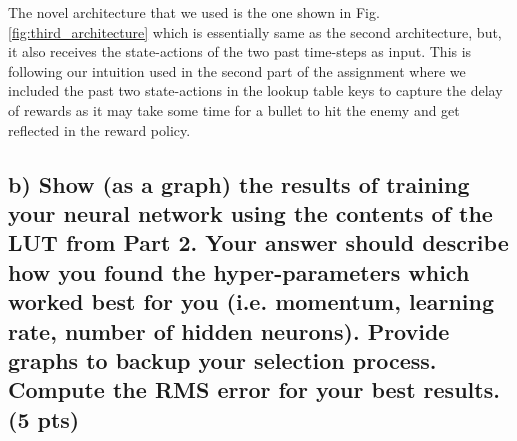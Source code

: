 \documentclass[a4paper,12pt]{article}
\begin{document}
The novel architecture that we used is the one shown in Fig. \ref{fig:third_architecture} which is essentially same as the second architecture, but, it also receives the state-actions of the two past time-steps as input. This is following our intuition used in the second part of the assignment where we included the past two state-actions in the lookup table keys to capture the delay of rewards as it may take some time for a bullet to hit the enemy and get reflected in the reward policy. 

\pagebreak
\subsection{b) Show (as a graph) the results of training your neural network using the contents of the LUT from Part 2. Your answer should describe how you found the hyper-parameters which worked best for you (i.e. momentum, learning rate, number of hidden neurons). Provide graphs to backup your selection process. Compute the RMS error for your best results. (5 pts)}
\end{document}
